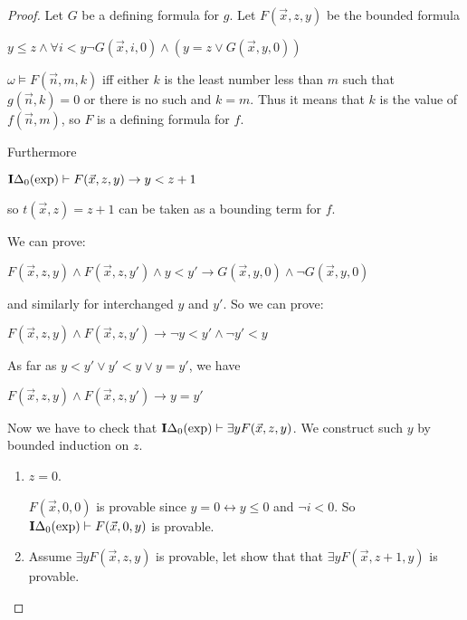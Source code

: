 \documentclass[8pt]{article}
\theoremstyle{definition}
\theoremstyle{definition}
\theoremstyle{definition}
\theoremstyle{definition}
\theoremstyle{definition}
\theoremstyle{definition}
\theoremstyle{definition}
\theoremstyle{definition}
\theoremstyle{definition}
\theoremstyle{definition}
\theoremstyle{definition}
\theoremstyle{definition}
\theoremstyle{definition}
\theoremstyle{question}
\begin{document}
\begin{proof}
   Let $G$ be a defining formula for $g$. Let $F(\vec{x}, z, y)$ be the bounded formula
   \begin{center}
    $y \leq z \land \forall i < y \neg G(\vec{x}, i, 0) \land (y = z \lor G(\vec{x}, y, 0))$
   \end{center}

   $\omega \models F(\vec{n}, m, k)$ iff either $k$ is the least number less than $m$ such that $g(\vec{n}, k) = 0$ or 
   there is no such and $k = m$. Thus it means that $k$ is the value of $f(\vec{n}, m)$, so $F$ is a defining formula for $f$.

   Furthermore
   \begin{center}
   ${\bf I}\Delta_0(\operatorname{exp}) \vdash F(\vec{x}, z, y) \to y < z + 1$
   \end{center}
   so $t(\vec{x}, z) = z + 1$ can be taken as a bounding term for $f$.

   We can prove:
   \begin{center}
    $F(\vec{x}, z, y) \land F(\vec{x}, z, y') \land y < y' \to G(\vec{x}, y, 0) \land \neg G(\vec{x}, y, 0)$
   \end{center}
   and similarly for interchanged $y$ and $y'$. So we can prove:
   \begin{center}
    $F(\vec{x}, z, y) \land F(\vec{x}, z, y') \to \neg y < y' \land \neg y' < y$
   \end{center}
   As far as $y < y' \lor y' < y \lor y = y'$, we have
   \begin{center}
    $F(\vec{x}, z, y) \land F(\vec{x}, z, y') \to y = y'$
   \end{center}

   Now we have to check that ${\bf I}\Delta_0(\operatorname{exp}) \vdash \exists y F(\vec{x}, z, y)$.
   We construct such $y$ by bounded induction on $z$.

   \begin{enumerate}
    \item $z = 0$.

    $F(\vec{x}, 0, 0)$ is provable since $y = 0 \leftrightarrow y \leq 0$ and $\neg i < 0$. 
    So ${\bf I}\Delta_0(\operatorname{exp}) \vdash F(\vec{x}, 0, y)$ is provable.
    \item Assume $\exists y F(\vec{x}, z, y)$ is provable, let show that that $\exists y F(\vec{x}, z + 1, y)$ is provable.


\end{enumerate}
\end{proof}
\end{document}
